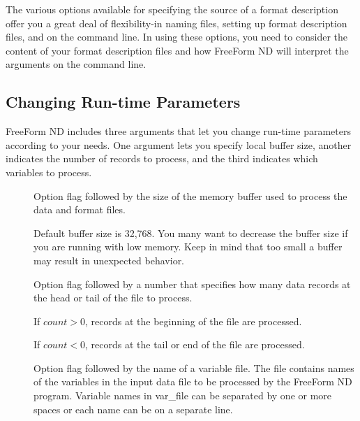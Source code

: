 
The various options available for specifying the source of a format
description offer you a great deal of flexibility-in naming files,
setting up format description files, and on the command line. In using
these options, you need to consider the content of your format
description files and how FreeForm ND will interpret the arguments on
the command line.

\subsection{Changing Run-time Parameters}

FreeForm ND includes three arguments that let you change run-time
parameters according to your needs. One argument lets you specify
local buffer size, another indicates the number of records to process,
and the third indicates which variables to process.

\begin{description}

\item[\dashb]
  
  Option flag followed by the size of the memory buffer used to
  process the data and format files.
  
  Default buffer size is 32,768. You many want to decrease the buffer
  size if you are running with low memory. Keep in mind that too small
  a buffer may result in unexpected behavior.

\item[\dashc]

  Option flag followed by a number that specifies how many data
  records at the head or tail of the file to process.
  
  If $count > 0$,  records at the beginning of the file are
  processed.
  
  If $count < 0$,  records at the tail or end of the file
  are processed.

\item[\dashvv]
  
  Option flag followed by the name of a variable file. The file
  contains names of the variables in the input data file to be
  processed by the FreeForm ND program. Variable names in var_file can
  be separated by one or more spaces or each name can be on a separate
  line.
\end{description}

